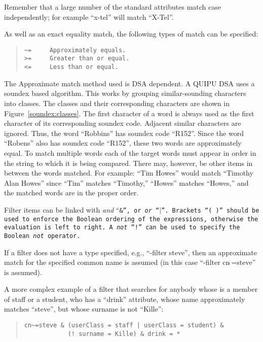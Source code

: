 Remember that a large number of the standard attributes match case
independently; for example ``x-tel'' will match ``X-Tel''.

As well as an exact equality match, the 
following types of match can be specified:
\begin{quote}\begin{verbatim}
~=     Approximately equals.
>=     Greater than or equal.
<=     Less than or equal.
\end{verbatim}\end{quote}

The Approximate match method used is DSA dependent.  A QUIPU DSA uses
a soundex based algorithm.  This works by grouping 
similar-sounding characters into classes.  The classes
and their corresponding characters are shown in
Figure~\ref{soundex:classes}.
The first character of a word is always used as the first character of
its corresponding soundex code. Adjacent similar characters are
ignored. Thus, the word ``Robbins'' has soundex
code ``R152''. Since the word
``Robens'' also has soundex code ``R152'', these two words are
approximately equal.
To match multiple words
each of the target words must appear in order in the string
to which it is being compared.  There may, however, be other items in
between the words matched.  For example:  ``Tim Howes'' would match
``Timothy Alan Howes'' since ``Tim'' matches ``Timothy,'' 
``Howes'' matches ``Howes,'' and the matched words are in the
proper order.


Filter items can be linked with {\em and} ``\tt \&\rm '', or {\em or} 
``\tt $|$\rm ''.  Brackets ``\tt( )\rm '' 
should be used to enforce the Boolean 
ordering of the expressions, otherwise the evaluation is left to right.
A {\em not} ``\tt !\rm '' can be used to specify the Boolean {\em not}
operator.

If a filter does not have a type specified, e.g., ``-filter steve'',
then an approximate match for the specified common name is assumed
(in this case ``-filter cn$\tilde{\ }$=steve'' is assumed).

A more complex example of a filter 
that searches for anybody whose is a member of staff 
or a student, who has a ``drink'' attribute,
whose name approximately matches ``steve'', but whose surname is 
not ``Kille'':
\begin{quote}\small\begin{verbatim}
cn~=steve & (userClass = staff | userClass = student) &
            (! surname = Kille) & drink = *
\end{verbatim}\end{quote}


